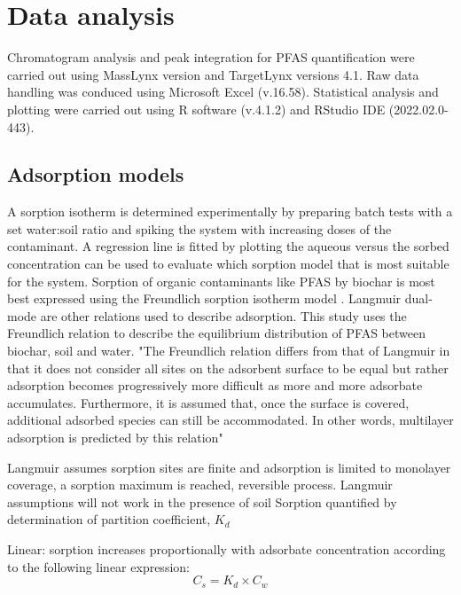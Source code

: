 
\section{Data analysis}\label{sec:data_analysis}
Chromatogram analysis and peak integration for PFAS quantification were carried out using MassLynx version and TargetLynx versions 4.1.  Raw data handling was conduced using Microsoft Excel (v.16.58). Statistical analysis and plotting were carried out using R software (v.4.1.2) and RStudio IDE (2022.02.0-443).

\subsection{Adsorption models}
A sorption isotherm is determined experimentally by preparing batch tests with a set water:soil ratio and spiking the system with increasing doses of the contaminant. A regression line is fitted by plotting the aqueous versus the sorbed concentration can be used to evaluate which sorption model that is most suitable for the system. Sorption of organic contaminants like PFAS by biochar is most best expressed using the Freundlich sorption isotherm model . Langmuir dual-mode are other relations used to describe adsorption. This study uses the Freundlich relation to describe the equilibrium distribution of PFAS between biochar, soil and water. "The Freundlich relation differs from that of Langmuir in that it does not consider all sites on the adsorbent surface to be equal but rather adsorption becomes progressively more difficult as more and more adsorbate accumulates. Furthermore, it is assumed that, once the surface is covered, additional adsorbed species can still be accommodated. In other words, multilayer adsorption is predicted by this relation" \citep{vanloon2017Ch14}

Langmuir assumes sorption sites are finite and adsorption is limited to monolayer coverage, a sorption maximum is reached, reversible process. Langmuir assumptions will not work in the presence of soil
Sorption quantified by determination of partition coefficient, $K_d$

\citep{Li2019} 

Linear: sorption increases proportionally with adsorbate concentration according to the following linear expression:
\begin{equation}\label{linear}
C_s = K_d \times C_w
\end{equation}

